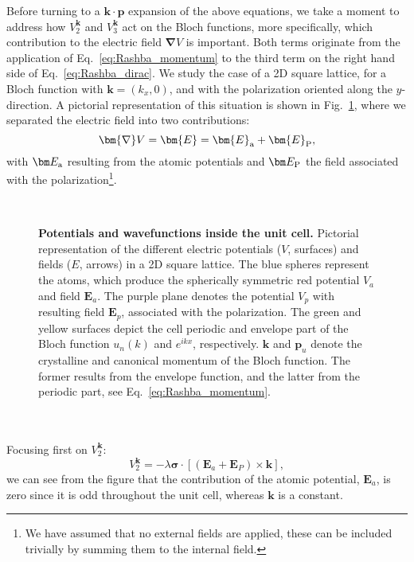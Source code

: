 Before turning to a $\bm{k} \cdot \bm{p}$ expansion of the above equations, we take a moment to address how $V^{\bm k}_2$ and $V^{\bm k}_3$ act on the Bloch functions, more specifically, which contribution to the electric field $\bm{\nabla}V$ is important.
Both terms originate from the application of Eq.~\eqref{eq:Rashba_momentum} to the third term on the right hand side of Eq.~\eqref{eq:Rashba_dirac}.
We study the case of a 2D square lattice, for a Bloch function with $\bm k = (k_x, 0)$, and with the polarization oriented along the $y$-direction.
A pictorial representation of this situation is shown in Fig.~\ref{fig:Efield_cell_drawing}, where we separated the electric field into two contributions:
\begin{equation}
	\bm{\nabla} V = \bm{E} = \bm{E}_{\rm a} + \bm{E}_{\rm P},
\end{equation}
with $\bm E_{\rm a}$ resulting from the atomic potentials and $\bm E_{\rm P}$ the field associated with the polarization\footnote{We have assumed that no external fields are applied, these can be included trivially by summing them to the internal field.}.
\begin{figure}[h]
~\centering
{}\caption{\label{fig:Efield_cell_drawing}{\bf Potentials and wavefunctions inside the unit cell.} Pictorial representation of the different electric potentials ($V$, surfaces) and fields ($E$, arrows) in a 2D square lattice. The blue spheres represent the atoms, which produce the spherically symmetric red potential $V_a$ and field $\bm E_a$. The purple plane denotes the potential $V_p$ with resulting field $\bm E_p$, associated with the polarization. The green and yellow surfaces depict the cell periodic and envelope part of the Bloch function $u_n(k)$ and $e^{ikx}$, respectively. $\bm k$ and $\bm p_u$ denote the crystalline and canonical momentum of the Bloch function.
The former results from the envelope function, and the latter from the periodic part, see Eq.~\eqref{eq:Rashba_momentum}.}
\end{figure}
\\\\
Focusing first on $V^{\bm k}_2$:
\begin{equation}
	\label{eq:Rashba_purerel}
	V^{\bm k}_2 = -\lambda \bm{\sigma} \cdot \left[ (\bm E_a + \bm E_P) \times \bm{k}\right],
\end{equation}
we can see from the figure that the contribution of the atomic potential, $\bm E_a$, is zero since it is odd throughout the unit cell, whereas $\bm k$ is a constant.
